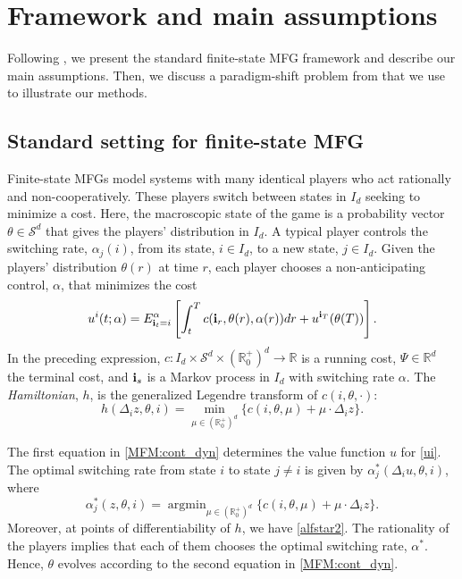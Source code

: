 \documentclass[12pt]{amsart}
\newcommand{\argmin}{\operatorname{argmin}}
\newcommand{\Rr}{{\mathbb{R}}}
\newcommand{\1}{{\chi}}
\newcommand{\bi}{{\bold{i}}}
\newcommand{\Ss}{\mathcal{S}}
\theoremstyle{definition}
\begin{document}
\section{Framework and main assumptions} 
\label{assp}
Following \cite{GMS2}, we present the standard finite-state MFG framework and describe
our main assumptions.
Then, we discuss 
a paradigm-shift problem from \cite{BesancenotDogguy} that we
use to illustrate our methods.   

\subsection{Standard setting for finite-state MFG} 
\label{sub:standard_setting_for_finite_state_mfg}

Finite-state MFGs model systems with many identical players who act rationally and non-cooperatively. 
These players switch between states in $I_d$ seeking to minimize a cost.
Here, the macroscopic state of the game is a probability vector $\theta\in \Ss^d$ that gives the players' distribution in $I_d$. 
A typical player controls
the switching rate, $\alpha_j(i)$, from its state, $i\in I_d$, to a new state, $j\in I_d$.
Given the players' distribution $\theta(r)$ at time $r$, each player chooses a non-anticipating control, $\alpha$, that minimizes the cost
\begin{equation}
\label{ui}
u^i(t;\alpha)=E_{\bi_t=i}^{\alpha} \left[\int_t^T c(\bi_r,\theta(r),\alpha(r)) dr + u^{\bi_T}(\theta(T))\right]. 
\end{equation}
In the preceding expression,  $c:I_d\times \Ss^d\times(\Rr_0^+)^d\to \Rr$ is a running cost, $\Psi\in \Rr^d$ the terminal cost, and $\bi_s$ is a Markov process in $I_d$ with switching rate $\alpha$. 
The \emph{Hamiltonian}, $h$,  is the generalized Legendre transform of  $c(i,\theta,\cdot)$: 
        \begin{equation*}
                h(\Delta_i z,\theta,i) = \min_{\mu \in(\Rr^+_0)^d} \{ c(i,\theta,\mu) + \mu \cdot \Delta_i z\}.
        \end{equation*}
        
The first equation in \eqref{MFM:cont_dyn} determines the value function $u$ for \eqref{ui}. 
The optimal switching rate from state $i$ to state $j\neq i$ is given by
$\alpha^*_j(\Delta_iu,\theta,i)$, 
where
\begin{equation}
\label{alfstar}
        \alpha^*_j(z,\theta,i)= \argmin_{\mu \in(\Rr^+_0)^d} \{c(i,\theta,\mu)+\mu \cdot \Delta_i z\}.
\end{equation}
Moreover, at points of differentiability of $h$, we have \eqref{alfstar2}. 
The rationality of the players implies that each of them chooses the optimal switching rate, $\alpha^*$. 
Hence, $\theta$ evolves according to the second equation in \eqref{MFM:cont_dyn}.
\end{document}
